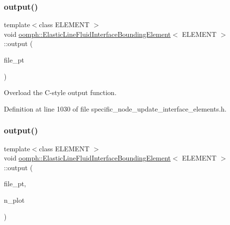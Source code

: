 \subsubsection{\texorpdfstring{output()}{output()}\hspace{0.1cm}{\footnotesize\ttfamily [3/4]}}
{\footnotesize\ttfamily template$<$class E\+L\+E\+M\+E\+NT $>$ \\
void \hyperlink{classoomph_1_1ElasticLineFluidInterfaceBoundingElement}{oomph\+::\+Elastic\+Line\+Fluid\+Interface\+Bounding\+Element}$<$ E\+L\+E\+M\+E\+NT $>$\+::output (\begin{DoxyParamCaption}\item[{F\+I\+LE $\ast$}]{file\+\_\+pt }\end{DoxyParamCaption})\hspace{0.3cm}{\ttfamily [inline]}}



Overload the C-\/style output function. 



Definition at line 1030 of file specific\+\_\+node\+\_\+update\+\_\+interface\+\_\+elements.\+h.

\mbox{\label{classoomph_1_1ElasticLineFluidInterfaceBoundingElement_a6e4c4d356c7d66f6b5ec4c7a375ecc91}} 
\subsubsection{\texorpdfstring{output()}{output()}\hspace{0.1cm}{\footnotesize\ttfamily [4/4]}}
{\footnotesize\ttfamily template$<$class E\+L\+E\+M\+E\+NT $>$ \\
void \hyperlink{classoomph_1_1ElasticLineFluidInterfaceBoundingElement}{oomph\+::\+Elastic\+Line\+Fluid\+Interface\+Bounding\+Element}$<$ E\+L\+E\+M\+E\+NT $>$\+::output (\begin{DoxyParamCaption}\item[{F\+I\+LE $\ast$}]{file\+\_\+pt,  }\item[{const unsigned \&}]{n\+\_\+plot }\end{DoxyParamCaption})\hspace{0.3cm}{\ttfamily [inline]}}



